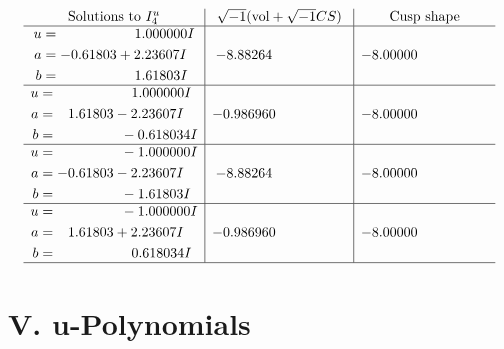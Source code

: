 \documentclass[1p]{elsarticle_modified}
\theoremstyle{definition}
\newcommand{\I}{\sqrt{-1}}
\begin{document}
$$\begin{array}{c|c|c}  
\text{Solutions to }I^u_{4}& \I (\text{vol} + \sqrt{-1}CS) & \text{Cusp shape}\\
 \hline 
\begin{aligned}
u &= \phantom{-0.000000 -}1.000000 I \\
a &= -0.61803 + 2.23607 I \\
b &= \phantom{-0.000000 -}1.61803 I\end{aligned}
 & -8.88264\phantom{ +0.000000I} & -8.00000\phantom{ +0.000000I} \\ \hline\begin{aligned}
u &= \phantom{-0.000000 -}1.000000 I \\
a &= \phantom{-}1.61803 - 2.23607 I \\
b &= \phantom{-0.000000 } -0.618034 I\end{aligned}
 & -0.986960\phantom{ +0.000000I} & -8.00000\phantom{ +0.000000I} \\ \hline\begin{aligned}
u &= \phantom{-0.000000 } -1.000000 I \\
a &= -0.61803 - 2.23607 I \\
b &= \phantom{-0.000000 } -1.61803 I\end{aligned}
 & -8.88264\phantom{ +0.000000I} & -8.00000\phantom{ +0.000000I} \\ \hline\begin{aligned}
u &= \phantom{-0.000000 } -1.000000 I \\
a &= \phantom{-}1.61803 + 2.23607 I \\
b &= \phantom{-0.000000 -}0.618034 I\end{aligned}
 & -0.986960\phantom{ +0.000000I} & -8.00000\phantom{ +0.000000I}\\
 \hline 
 \end{array}$$\newpage
\newpage\renewcommand{\arraystretch}{1}
\centering \section*{ V. u-Polynomials}
\end{document}
